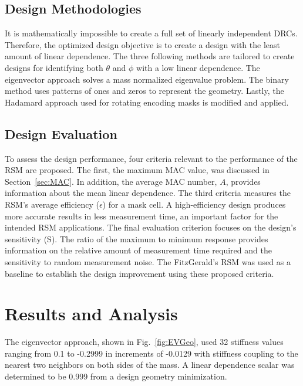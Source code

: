 \documentclass[twocolumn,10pt,final]{asme2ej}
\begin{document}
\vspace{-0.2 cm}
\subsection{Design Methodologies} \label{design-methods}
It is mathematically impossible to create a full set of linearly independent DRCs.  
Therefore, the optimized design objective is to create a design with the least amount of linear dependence.  
The three following methods are tailored to create designs for identifying both $\theta$ and $\phi$ with a low linear dependence.  
The eigenvector approach solves a mass normalized eigenvalue problem.  
The binary method uses patterns of ones and zeros to represent the geometry.
Lastly, the Hadamard approach used for rotating encoding masks is modified and applied.

\vspace{-0.2 cm}
\subsection{Design Evaluation}
\label{sec:Eval}
To assess the design performance, four criteria relevant to the performance of the RSM are proposed.  The first, the maximum MAC value, was discussed in Section~\ref{sec:MAC}.  
In addition, the average MAC number, $A$, provides information about the mean linear dependence.  
The third criteria measures the RSM's average efficiency ($\epsilon$) for a mask cell. 
A high-efficiency design produces more accurate results in less measurement time, an important factor for the intended RSM applications.  
The final evaluation criterion focuses on the design's sensitivity (S).  
The ratio of the maximum to minimum response provides information on the relative amount of measurement time required and the  sensitivity to random measurement noise.
The FitzGerald's RSM was used as a baseline to establish the design improvement using these proposed criteria.  

\vspace{-0.3 cm}
\section{Results and Analysis}
The eigenvector approach, shown in Fig.~\ref{fig:EVGeo}, used 32 stiffness values ranging from 0.1 to -0.2999 in increments of -0.0129 with stiffness coupling to the nearest two neighbors on both sides of the mass.
A linear dependence scalar was determined to be 0.999 from a design geometry minimization.
\end{document}
